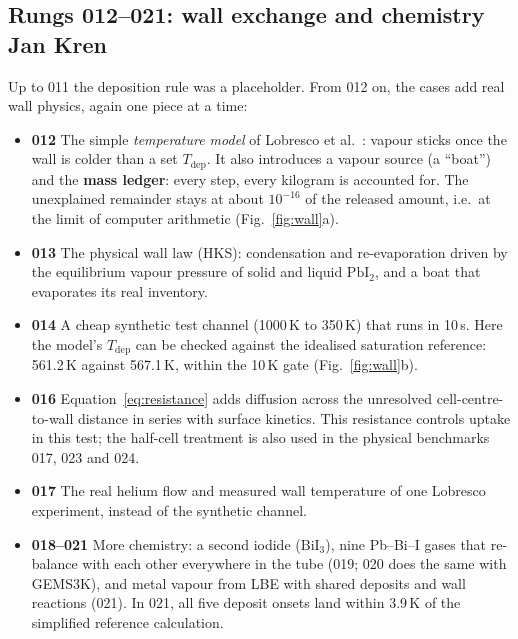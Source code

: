 \documentclass[10pt,a4paper]{article}
\newcommand{\PbI}{\ensuremath{\mathrm{PbI}_2}}
\newcommand{\BiI}{\ensuremath{\mathrm{BiI}_3}}
\newcommand{\Tdep}{\ensuremath{T_\mathrm{dep}}}
\newcommand{\case}[1]{\textbf{\color{PSIgray}#1}}
\begin{document}
\subsection{Rungs 012--021: wall exchange and chemistry \hfill\normalfont\small\color{PSIgray}Jan Kren}
Up to 011 the deposition rule was a placeholder. From 012 on, the cases add
real wall physics, again one piece at a time:

\begin{itemize}
  \item \case{012} The simple \emph{temperature model} of Lobresco et
    al.~\cite{Lobresco2026}: vapour sticks once the wall is colder than a
    set \Tdep{}. It also introduces a vapour source (a ``boat'') and the
    \textbf{mass ledger}: every step, every kilogram is accounted for. The
    unexplained remainder stays at about $10^{-16}$ of the released amount,
    i.e.\ at the limit of computer arithmetic (Fig.~\ref{fig:wall}a).
  \item \case{013} The physical wall law (HKS): condensation and
    re-evaporation driven by the equilibrium vapour pressure of solid and
    liquid \PbI{}, and a boat that evaporates its real inventory.
  \item \case{014} A cheap synthetic test channel (1000\,K to 350\,K)
    that runs in 10\,s. Here the model's \Tdep{} can be checked against the
    idealised saturation reference: 561.2\,K against 567.1\,K, within the
    10\,K gate (Fig.~\ref{fig:wall}b).
  \item \case{016} Equation~\eqref{eq:resistance} adds diffusion across the
    unresolved cell-centre-to-wall distance in series with surface kinetics.
    This resistance controls uptake in this test; the half-cell treatment
    is also used in the physical benchmarks 017, 023 and 024.
  \item \case{017} The real helium flow and measured wall temperature of
    one Lobresco experiment, instead of the synthetic channel.
  \item \case{018--021} More chemistry: a second iodide (\BiI{}), nine
    Pb--Bi--I gases that re-balance with each other everywhere in the tube
    (019; 020 does the same with GEMS3K), and metal vapour from LBE with
    shared deposits and wall reactions (021). In 021, all five deposit onsets
    land within 3.9\,K of the simplified reference calculation.
\end{itemize}
\end{document}
